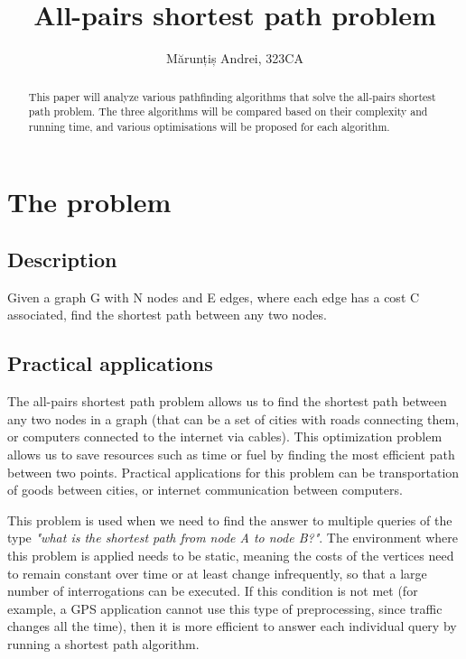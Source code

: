 \documentclass[runningheads]{llncs}
\begin{document}
%
\title{All-pairs shortest path problem}
%
%
\author{Mărunțiș Andrei, 323CA}
%
\maketitle              %
%
\begin{abstract}
This paper will analyze various pathfinding algorithms that solve the all-pairs shortest path problem. The three algorithms will be compared based on their complexity and running time, and various optimisations will be proposed for each algorithm.

\end{abstract}
%
%
%
\section{The problem}
\subsection{Description}
Given a graph G with N nodes and E edges, where each edge has a cost C associated, find the shortest path between any two nodes.

\subsection{Practical applications}
The all-pairs shortest path problem allows us to find the shortest path between any two nodes in a graph (that can be a set of cities with roads connecting them, or computers connected to the internet via cables). This optimization problem allows us to save resources such as time or fuel by finding the most efficient path between two points. Practical applications for this problem can be transportation of goods between cities, or internet communication between computers.

This problem is used when we need to find the answer to multiple queries of the type \textit{"what is the shortest path from node A to node B?"}. The environment where this problem is applied needs to be static, meaning the costs of the vertices need to remain constant over time or at least change infrequently, so that a large number of interrogations can be executed. If this condition is not met (for example, a GPS application cannot use this type of preprocessing, since traffic changes all the time), then it is more efficient to answer each individual query by running a shortest path algorithm.
\end{document}
